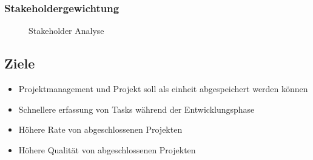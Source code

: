 \subsubsection{Stakeholdergewichtung}
\vspace{1cm}
\begin{figure}[H]
    \centering
{}
\caption{Stakeholder Analyse}
\end{figure}
\newpage

\begin{center}
    
\end{center}




\newpage
\subsection{Ziele}
\begin{itemize}
    \item Projektmanagement und Projekt soll als einheit abgespeichert werden können
    \item Schnellere erfassung von Tasks während der Entwicklungsphase
    \item Höhere Rate von abgeschlossenen Projekten
    \item Höhere Qualität von abgeschlossenen Projekten
\end{itemize}
\newpage
